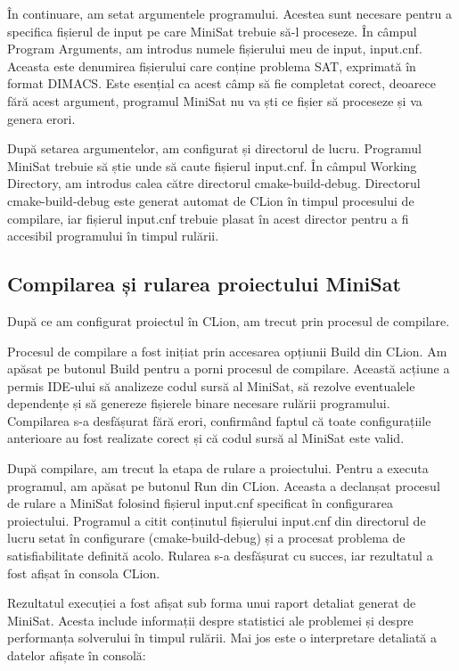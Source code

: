 \documentclass[runningheads]{llncs}
\begin{document}
În continuare, am setat argumentele programului. Acestea sunt necesare pentru a specifica fișierul de input pe care MiniSat trebuie să-l proceseze. În câmpul Program Arguments, am introdus numele fișierului meu de input, input.cnf. Aceasta este denumirea fișierului care conține problema SAT, exprimată în format DIMACS. Este esențial ca acest câmp să fie completat corect, deoarece fără acest argument, programul MiniSat nu va ști ce fișier să proceseze și va genera erori.

După setarea argumentelor, am configurat și directorul de lucru. Programul MiniSat trebuie să știe unde să caute fișierul input.cnf. În câmpul Working Directory, am introdus calea către directorul cmake-build-debug. Directorul cmake-build-debug este generat automat de CLion în timpul procesului de compilare, iar fișierul input.cnf trebuie plasat în acest director pentru a fi accesibil programului în timpul rulării.

\subsection{Compilarea și rularea proiectului MiniSat}

După ce am configurat proiectul în CLion, am trecut prin procesul de compilare.

Procesul de compilare a fost inițiat prin accesarea opțiunii Build din CLion. Am apăsat pe butonul Build pentru a porni procesul de compilare. Această acțiune a permis IDE-ului să analizeze codul sursă al MiniSat, să rezolve eventualele dependențe și să genereze fișierele binare necesare rulării programului. Compilarea s-a desfășurat fără erori, confirmând faptul că toate configurațiile anterioare au fost realizate corect și că codul sursă al MiniSat este valid.

După compilare, am trecut la etapa de rulare a proiectului. Pentru a executa programul, am apăsat pe butonul Run din CLion. Aceasta a declanșat procesul de rulare a MiniSat folosind fișierul input.cnf specificat în configurarea proiectului. Programul a citit conținutul fișierului input.cnf din directorul de lucru setat în configurare (cmake-build-debug) și a procesat problema de satisfiabilitate definită acolo. Rularea s-a desfășurat cu succes, iar rezultatul a fost afișat în consola CLion.

Rezultatul execuției a fost afișat sub forma unui raport detaliat generat de MiniSat. Acesta include informații despre statistici ale problemei și despre performanța solverului în timpul rulării. Mai jos este o interpretare detaliată a datelor afișate în consolă:
\end{document}
